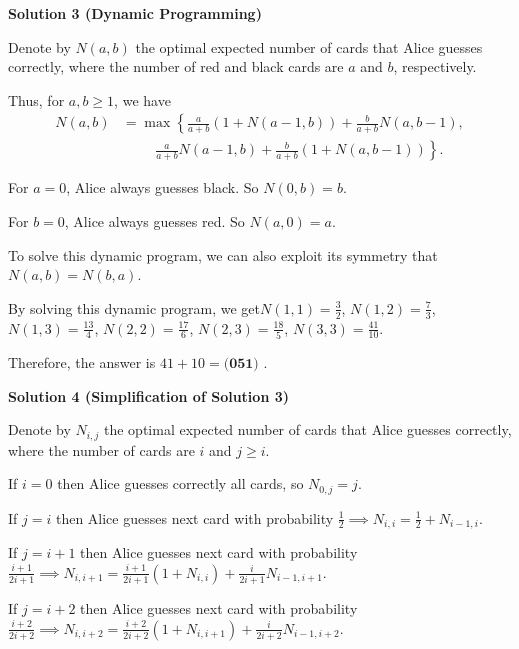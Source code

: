 \begin{enumerate}
{{\textbf{Solution 3 (Dynamic Programming)}

Denote by $N \left( a, b \right)$ the optimal expected number of cards that Alice guesses correctly, where the number of red and black cards are $a$ and $b$, respectively.

 Thus, for $a, b \geq 1$, we have
 \begin{align*} N \left( a, b \right) & = \max \left\{ \frac{a}{a+b} \left( 1 + N \left( a - 1 , b \right) \right) + \frac{b}{a+b} N \left( a , b - 1 \right) , \right. \\ & \hspace{1cm} \left. \frac{a}{a+b} N \left( a - 1 , b \right) + \frac{b}{a+b} \left( 1 + N \left( a , b - 1 \right) \right) \right\} . \end{align*}


 For $a = 0$, Alice always guesses black. So $N \left( 0 , b \right) = b$.

 For $b = 0$, Alice always guesses red. So $N \left( a , 0 \right) = a$.

 To solve this dynamic program, we can also exploit its symmetry that $N \left( a , b \right) = N \left( b , a \right)$.

 By solving this dynamic program, we get$N \left( 1, 1 \right) = \frac{3}{2}$, $N \left( 1, 2 \right) = \frac{7}{3}$, $N \left( 1 , 3 \right) = \frac{13}{4}$, $N \left( 2 , 2 \right) = \frac{17}{6}$, $N \left( 2 , 3 \right) = \frac{18}{5}$, $N \left( 3, 3 \right) = \frac{41}{10}$.

 Therefore, the answer is $41 + 10 = \boxed{\textbf{(051) }}$.

 



\textbf{Solution 4 (Simplification of Solution 3)}

Denote by $N_{i,j}$ the optimal expected number of cards that Alice guesses correctly, where the number of cards are $i$ and $j \ge i.$

 If $i = 0$ then Alice guesses correctly all cards, so $N_{0,j} = j.$

 If $j = i$ then Alice guesses next card with probability  $\frac {1}{2} \implies N_{i,i} = \frac {1}{2} + N_{i-1,i}.$

 If $j = i+1$ then Alice guesses next card with probability $\frac {i+1}{2i+1} \implies N_{i,i+1} = \frac {i+1}{2i+1} (1+ N_{i,i}) + \frac{i}{2i+1}  N_{i-1,i+1}.$

 If $j = i+2$ then Alice guesses next card with probability  $\frac {i+2}{2i+2} \implies N_{i,i+2} = \frac {i+2}{2i+2} (1+ N_{i,i+1}) + \frac{i}{2i+2}  N_{i-1,i+2}.$

}}
\end{enumerate}
